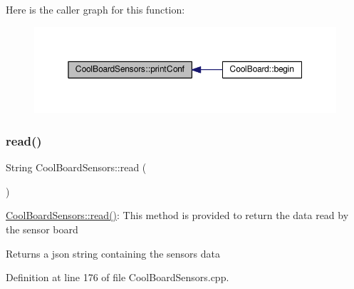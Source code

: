 Here is the caller graph for this function\+:\nopagebreak
\begin{figure}[H]
\begin{center}
\leavevmode
\includegraphics[width=350pt]{de/d46/class_cool_board_sensors_af6fd79505815b204c178617ecf54c873_icgraph}
\end{center}
\end{figure}
\mbox{\label{class_cool_board_sensors_a91badb2539d91fda8679f2a597874c48}} 
\subsubsection{\texorpdfstring{read()}{read()}}
{\footnotesize\ttfamily String Cool\+Board\+Sensors\+::read (\begin{DoxyParamCaption}{ }\end{DoxyParamCaption})}

\hyperlink{class_cool_board_sensors_a91badb2539d91fda8679f2a597874c48}{Cool\+Board\+Sensors\+::read()}\+: This method is provided to return the data read by the sensor board

\begin{DoxyReturn}{Returns}
a json string containing the sensors data 
\end{DoxyReturn}


Definition at line 176 of file Cool\+Board\+Sensors.\+cpp.


